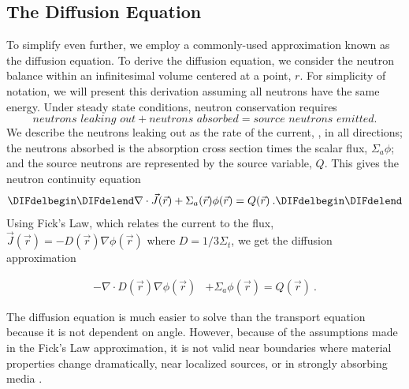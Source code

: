 \DIFaddend \subsection{The Diffusion Equation}
To simplify even further, we employ a commonly-used approximation known as the diffusion equation. To derive the diffusion equation, we consider the neutron balance within an infinitesimal volume centered at a point, $r$. For simplicity of notation, we will present this derivation assuming all neutrons have the same energy. Under steady state conditions, neutron conservation requires
%
\begin{equation}
    \textit{neutrons leaking out} + \textit{neutrons absorbed} = \textit{source neutrons emitted}.
\end{equation}
We describe the neutrons leaking out as the rate of the current, \DIFdelbegin {}\DIFdelend \DIFaddbegin {}\DIFaddend , in all directions; the neutrons absorbed is the absorption cross section times the scalar flux, $\Sigma_a\phi$; and the source neutrons are represented by the source variable, $Q$. This gives the neutron continuity equation
\begin{equation}
    \DIFdelbegin %

\DIFdelend \nabla\cdot \vec{J}(\vec{r}) + \Sigma_a(\vec{r})\phi(\vec{r}) = Q(\vec{r})\:.
\DIFdelbegin %

\DIFdelend \end{equation}
Using Fick's Law, which relates the current to the flux, $\vec{J}(\vec{r}) = -D(\vec{r})\nabla\phi(\vec{r})$ where $D = 1/3\Sigma_t$, we get the diffusion approximation

\begin{equation}
\begin{split}
 - \nabla \cdot D(\vec{r})\nabla\phi(\vec{r}) &+ \Sigma_a \phi(\vec{r}) = Q(\vec{r})\:.
\end{split}
\label{eq:diffusion_fixed_source}
\end{equation}

The diffusion equation is much easier to solve than the transport equation because it is not dependent on angle. However, because of the assumptions made in the Fick's Law approximation, it is not valid near boundaries where material properties change dramatically, near localized sources, or in strongly absorbing media \cite{lewis-miller}.

